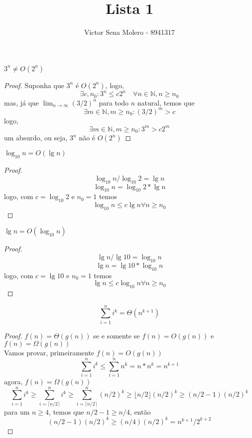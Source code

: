\documentclass[12pt]{article}
\newcommand{\N}{\mathbb{N}}
\newenvironment{problem}[2][Ex]{\begin{trivlist}
\item[\hskip \labelsep {\bfseries #1}\hskip \labelsep {\bfseries #2.}]}{\end{trivlist}}
\begin{document}
 
 
\title{Lista 1}
\author{Victor Sena Molero - 8941317}
\maketitle
 
\begin{problem}{1.a}
$3^n \neq O(2^n)$
\end{problem}
 
\begin{proof}
Suponha que $3^n$ é $O(2^n)$, logo, \\
$$ \exists c, n_0 : 3^n \leq c2^n \quad \forall n \in \N, n \geq n_0 $$
mas, já que $\lim_{n \rightarrow \infty}(3/2)^n$ para todo $n$ natural, temos que
$$ \exists m \in \N, m \geq n_0 : (3/2)^m > c $$
logo,
$$ \exists m \in \N, m \geq n_0 : 3^m > c2^m $$
um absurdo, ou seja,
$3^n$ não é $O(2^n)$
\end{proof}

\begin{problem}{1.b}
$\log_{10} n = O(\lg n)$
\end{problem}

\begin{proof}
$$ \log_{10} n / \log_{10} 2 = \lg n $$
$$ \log_{10} n = \log_{10} 2 * \lg n $$
logo, com $c = \log_{10} 2$ e $n_0 = 1$ temos
$$ \log_{10} n \leq c\lg{n} \forall n \geq n_0 $$
\end{proof}

\begin{problem}{1.c}
$\lg n = O(\log_{10} n)$
\end{problem}

\begin{proof}
$$ \lg n / \lg 10 = \log_{10} n $$
$$ \lg n = \lg 10 * \log_{10} n $$
logo, com $c = \lg 10$ e $n_0 = 1$ temos
$$ \lg n \leq c \log_{10} n \forall n \geq n_0 $$
\end{proof}

\begin{problem}{4.a}
$$\sum_{i=1}^{n} i^k = \Theta(n^{k+1})$$
\end{problem}

\begin{proof}
$ f(n) = \Theta(g(n)) $ se e somente se $ f(n) = O(g(n)) $ e $ f(n) = \Omega(g(n)) $ \\
Vamos provar, primeiramente $ f(n) = O(g(n)) $
$$ \sum_{i=1}^{n} i^k \leq \sum_{i=1}^{n} n^k = n*n^k = n^{k+1} $$
agora, $ f(n) = \Omega(g(n)) $
$$ \sum_{i=1}^{n} i^k \geq \sum_{i=\lceil n/2 \rceil}^{n} i^k \geq \sum_{i=\lceil n/2 \rceil}^{n} (n/2)^k \geq \lfloor n/2 \rfloor (n/2)^k \geq (n/2 - 1)(n/2)^k $$
para um $ n \geq 4 $, temos que $n/2 - 1 \geq n/4$, então
$$ (n/2 - 1)(n/2)^k  \geq (n/4)(n/2)^k = n^{k+1}/2^{k+2} $$
\end{proof}
\end{document}

